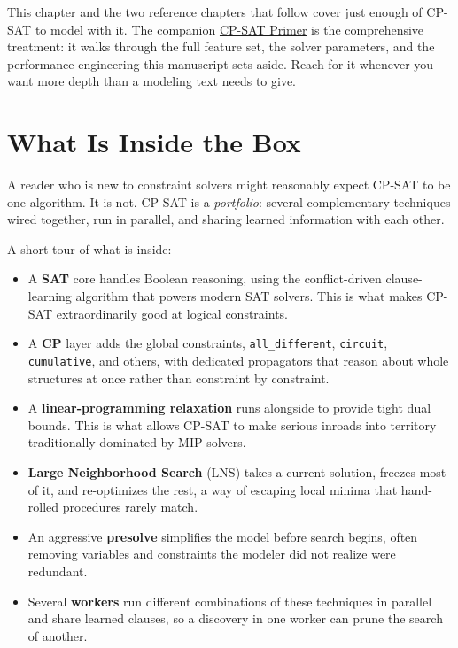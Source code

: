 \begin{platypusbook}
This chapter and the two reference chapters that follow cover just enough of
CP-SAT to model with it. The companion
\href{https://github.com/d-krupke/cpsat-primer}{CP-SAT Primer} is the
comprehensive treatment: it walks through the full feature set, the solver
parameters, and the performance engineering this manuscript sets aside. Reach
for it whenever you want more depth than a modeling text needs to give.
\end{platypusbook}

\section{What Is Inside the Box}\label{sec:5.1}

A reader who is new to constraint solvers might reasonably expect CP-SAT
to be one algorithm. It is not. CP-SAT is a \emph{portfolio}: several
complementary techniques wired together, run in parallel, and sharing
learned information with each other.

A short tour of what is inside:

\begin{itemize}
\item
  A \textbf{SAT} core handles Boolean reasoning, using the
  conflict-driven clause-learning algorithm that powers modern SAT
  solvers. This is what makes CP-SAT extraordinarily good at logical
  constraints.
\item
  A \textbf{CP} layer adds the global constraints,
  \lstinline!all_different!,
  \lstinline!circuit!,
  \lstinline!cumulative!, and others, with dedicated
  propagators that reason about whole structures at once rather than
  constraint by constraint.
\item
  A \textbf{linear-programming relaxation} runs alongside to provide
  tight dual bounds. This is what allows CP-SAT to make serious inroads
  into territory traditionally dominated by MIP solvers.
\item
  \textbf{Large Neighborhood Search} (LNS) takes a current solution,
  freezes most of it, and re-optimizes the rest, a way of escaping
  local minima that hand-rolled procedures rarely match.
\item
  An aggressive \textbf{presolve} simplifies the model before search
  begins, often removing variables and constraints the modeler did not
  realize were redundant.
\item
  Several \textbf{workers} run different combinations of these
  techniques in parallel and share learned clauses, so a discovery in
  one worker can prune the search of another.
\end{itemize}

